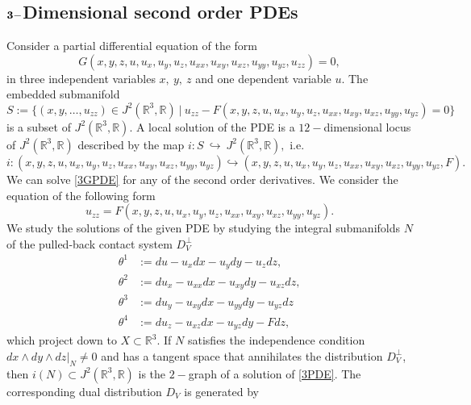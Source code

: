 \documentclass[a4paper, 11pt]{amsart}
\theoremstyle{definition}
\begin{document}
\subsection{${\bf{3-}}$Dimensional second order PDEs}
Consider a partial differential equation of the form
\begin{equation}\label{3GPDE}
  G(x,y,z,u,u_x,u_y,u_z,u_{xx},u_{xy},u_{xz},u_{yy},u_{yz},u_{zz})=0,
\end{equation}
in three independent variables $x,~y,~z$ and one dependent variable $u.$
The embedded submanifold
\[S:=\{(x,y,\ldots,u_{zz})\in J^2({\mathbb{R}}^3,{\mathbb{R}})~ |~ u_{zz}-F(x,y,z,u,u_x,u_y,u_z,u_{xx},u_{xy},u_{xz},u_{yy},u_{yz})=0\}\]
is a subset of $J^2({\mathbb{R}}^3,{\mathbb{R}}).$ A local solution of the PDE is a $12-$dimensional locus of $J^2({\mathbb{R}}^3,{\mathbb{R}})$ described by the map $i:S~\hookrightarrow~J^2({\mathbb{R}}^3,{\mathbb{R}}),$ i.e. \[i:(x,y,z,u,u_x,u_y,u_z,u_{xx},u_{xy},u_{xz},u_{yy},u_{yz})\hookrightarrow (x,y,z,u,u_x,u_y,u_z,u_{xx},u_{xy},u_{xz},u_{yy},u_{yz},F).\]
We can solve \eqref{3GPDE} for any of the second order derivatives. We consider the equation of the following form
\begin{equation}\label{3PDE}
  u_{zz}=F(x,y,z,u,u_x,u_y,u_z,u_{xx},u_{xy},u_{xz},u_{yy},u_{yz}).
\end{equation}
We study the solutions of the given PDE by studying the integral submanifolds $N$ of the pulled-back contact system $D^{\perp}_V$
\begin{align}
\theta^1&:=du-u_xdx-u_ydy-u_zdz,\nonumber\\
 \theta^2&:=du_x-u_{xx}dx-u_{xy}dy-u_{xz}dz,\label{3contact dist} \\
 \theta^3&:=du_y-u_{xy}d x-u_{yy}dy-u_{yz}dz \nonumber\\
 \theta^4&:=du_z-u_{xz}d x-u_{yz}dy-Fdz \nonumber,
 \end{align}
which project down to $X\subset {\mathbb{R}}^3.$ If $N$ satisfies the independence condition $dx\wedge dy\wedge dz| _N \neq 0$ and has a tangent space that annihilates the distribution $D^{\perp}_V$, then $i(N) \subset  J^2({\mathbb{R}}^3,{\mathbb{R}})$ is the $2-$graph of a solution of \eqref{3PDE}. The corresponding dual distribution $D_V$  is generated by
\end{document}
